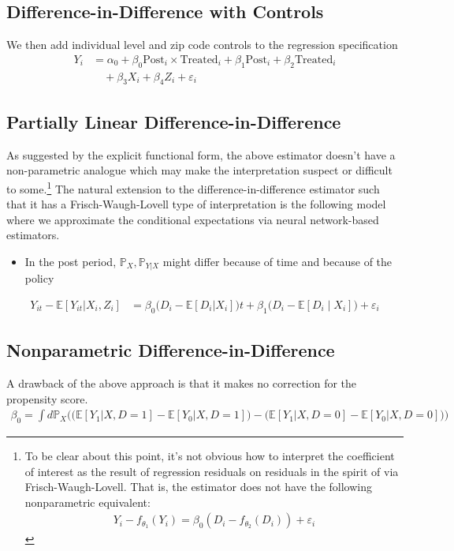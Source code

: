 \documentclass[a4paper,12pt]{article}
\begin{document}
\subsection{Difference-in-Difference with Controls}
We then add individual level and zip code controls to the regression specification
\begin{align*}
    Y_i &= \alpha _0 + \beta_0 \textrm{Post}_i \times \textrm{Treated}_i + \beta_1  \textrm{Post}_i + \beta_2 \textrm{Treated}_i \\ 
    &\quad + \beta _3X_i + \beta_4 Z_i + \varepsilon_i
\end{align*}

\subsection{Partially Linear Difference-in-Difference}
As suggested by the explicit functional form, the above estimator doesn't have a non-parametric analogue which may make the interpretation suspect or difficult to some.\footnote{To be clear about this point, it's not obvious how to interpret the coefficient of interest as the result of regression residuals on residuals in the spirit of via Frisch-Waugh-Lovell. That is, the estimator does not have the following nonparametric equivalent: 
\begin{align*}
    Y_i - f_{\theta _1}(Y_i) = \beta_0 (D_i-f_{\theta _2}(D_i)) + \varepsilon_i
\end{align*}}
The natural extension to the difference-in-difference estimator such that it has a Frisch-Waugh-Lovell type of interpretation is the following model where we approximate the conditional expectations via neural network-based estimators.

\begin{itemize}
  \item In the post period, $\mathbb{P}_X,\mathbb{P}_{Y|X}$ might differ because of time and because of the policy
\end{itemize}

\begin{align*}
    Y_{it} - \mathbb{E}[Y_{it} | X_i, Z_i] &= \beta _0 \big(D_i - \mathbb{E}[D_{i} | X_{i}]\big)t + \beta_1 \big(D_i - \mathbb{E}[D_{i} \mid X_{i}]\big) + \varepsilon_i
\end{align*}

\subsection{Nonparametric Difference-in-Difference}
A drawback of the above approach is that it makes no correction for the propensity score. 
\begin{align*}
    \beta _0 = \int d\mathbb{P}_X\Big(\big(\mathbb{E}[Y_1 |X,D=1] - \mathbb{E}[Y_0 |X,D=1]\big) -  \big(\mathbb{E}[Y_1 |X,D=0] - \mathbb{E}[Y_0 |X,D=0]\big)\Big)
\end{align*}
\end{document}

